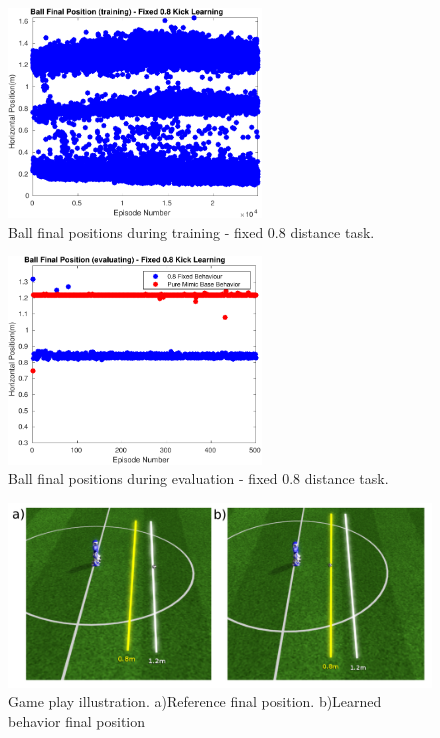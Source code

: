 \begin{figure}[H]
    \centering
    \includegraphics[width=0.6\textwidth]{Chapter7/plots/plot_ball_pos_08fix_kick_train.pdf} 
    \caption{Ball final positions during training - fixed 0.8 distance task.}
    \label{fig:RL_08_kick_pos_train}
\end{figure}

\begin{figure}[H]
    \centering
    \includegraphics[width=0.6\textwidth]{Chapter7/plots/plot_ball_pos_08fix_kick_eval.pdf} 
    \caption{Ball final positions during evaluation - fixed 0.8 distance task.}
    \label{fig:RL_08_kick_pos_eval}
\end{figure}

\begin{figure}[H]
    \centering
    \includegraphics[width=1.0\textwidth]{Chapter7/figures/kick_train_08.pdf} 
    \caption{Game play illustration. a)Reference final position. b)Learned behavior final position}
    \label{fig:RL_08_kick_roboviz}
\end{figure}

